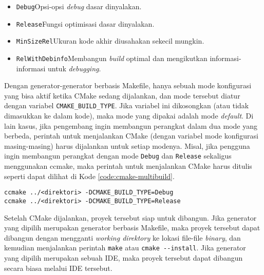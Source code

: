 \begin{enumerate}
\begin{itemize}
		\begin{itemize}
			\item \verb|Debug|\textemdash Opsi-opsi \textit{debug} dasar dinyalakan.
			\item \verb|Release|\textemdash Fungsi optimisasi dasar dinyalakan.
			\item \verb|MinSizeRel|\textemdash Ukuran kode akhir diusahakan sekecil mungkin.
			\item \verb|RelWithDebinfo|\textemdash Membangun \textit{build} optimal dan mengikutkan informasi-informasi untuk \textit{debugging}.
		\end{itemize}
		\newpage %
		Dengan generator-generator berbasis Makefile, hanya sebuah mode konfigurasi yang bisa aktif ketika CMake sedang dijalankan, dan mode tersebut diatur dengan variabel \verb|CMAKE_BUILD_TYPE|. Jika variabel ini dikosongkan (atau tidak dimasukkan ke dalam kode), maka mode yang dipakai adalah mode \textit{default}. Di lain kasus, jika pengembang ingin membangun perangkat dalam dua mode yang berbeda, perintah untuk menjalankan CMake (dengan variabel mode konfigurasi masing-masing) harus dijalankan untuk setiap modenya. Misal, jika pengguna ingin membangun perangkat dengan mode \verb|Debug| dan \verb|Release| sekaligus menggunakan ccmake, maka perintah untuk menjalankan CMake harus ditulis seperti dapat dilihat di Kode \ref{code:cmake-multibuild}.
		
	\end{itemize}
	
	\begin{lstlisting}[caption=Contoh kode pembangunan CMake lebih dari satu mode, label=code:cmake-multibuild]
ccmake ../<direktori> -DCMAKE_BUILD_TYPE=Debug
ccmake ../<direktori> -DCMAKE_BUILD_TYPE=Release
	\end{lstlisting}

	Setelah CMake dijalankan, proyek tersebut siap untuk dibangun. Jika generator yang dipilih merupakan generator berbasis Makefile, maka proyek tersebut dapat dibangun dengan mengganti \textit{working direktory} ke lokasi file-file \textit{binary}, dan kemudian menjalankan perintah \verb|make| atau \verb|cmake --install|. Jika generator yang dipilih merupakan sebuah IDE, maka proyek tersebut dapat dibangun secara biasa melalui IDE tersebut.
\end{enumerate}
